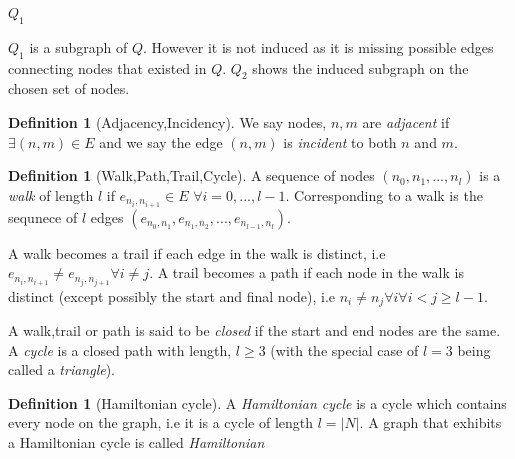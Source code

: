 \documentclass[a4paper,10pt]{article}
\theoremstyle{definition}
\newtheorem{definition}[theorem]{Definition}
\theoremstyle{definition}
\theoremstyle{remark}
\theoremstyle{definition}
\begin{document}
\begin{myfigure}
\begin{center}
\begin{submyfigure}{.3\textwidth}
\begin{center}
\end{center}
\caption{$Q_{1}$}
\label{subexamplefigure: induced subgraph}
\end{submyfigure}
\caption{ $Q_{1}$ is a subgraph of $Q$. However it is not induced as it is missing possible edges connecting nodes that existed in $Q$. $Q_{2}$ shows the induced subgraph on the chosen set of nodes. }
\end{center}
\label{examplefigure: subgraph example}
\end{myfigure}

\begin{definition}[Adjacency,Incidency]
We say nodes, $n,m$ are \textit{adjacent} if $\exists (n,m) \in E$ and we say the edge $(n,m)$ is \textit{incident} to both $n$ and $m$.
\end{definition}

\begin{definition}[Walk,Path,Trail,Cycle]
A sequence of nodes $(n_{0},n_{1},...,n_{l})$ is a \textit{walk} of length $l$ if $e_{n_{i},n_{i+1}} \in E$ $\forall i=0,...,l-1$. Corresponding to a walk is the sequnece of $l$ edges $(e_{n_{0},n_{1}},e_{n_{1},n_{2}},...,e_{n_{l-1},n_{l}})$.

A walk becomes a trail if each edge in the walk is distinct, i.e $e_{n_{i},n_{i+1}} \neq e_{n_{j},n_{j+1}} \forall i \neq j$. A trail becomes a path if each node in the walk is distinct (except possibly the start and final node), i.e $n_{i} \neq n_{j} \forall i \forall i < j \geq l-1$.

A walk,trail or path is said to be \textit{closed} if the start and end nodes are the same. A \textit{cycle} is a closed path with length, $l \geq 3$ (with the special case of $l=3$ being called a \textit{triangle}).
\end{definition}

\begin{definition}[Hamiltonian cycle]
A \textit{Hamiltonian cycle} is a cycle which contains every node on the graph, i.e it is a cycle of length $l=|N|$. A graph that exhibits a Hamiltonian cycle is called \textit{Hamiltonian}
\end{definition}
\end{document}

